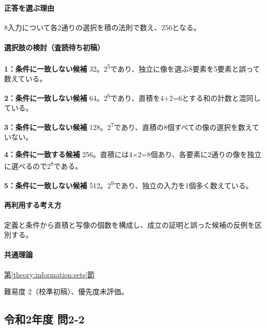\paragraph{正答を選ぶ理由} 8入力について各2通りの選択を積の法則で数え、256となる。

\paragraph{選択肢の検討（査読待ち初稿）}\mbox{}\par

\noindent\textbf{1：条件に一致しない候補} 32。2\textsuperscript{5}であり、独立に像を選ぶ8要素を5要素と誤って数えている。\par

\noindent\textbf{2：条件に一致しない候補} 64。2\textsuperscript{6}であり、直積を4+2=\allowbreak{}6とする和の計数と混同している。\par

\noindent\textbf{3：条件に一致しない候補} 128。2\textsuperscript{7}であり、直積の8個すべての像の選択を数えていない。\par

\noindent\textbf{4：条件に一致する候補} 256。直積には4×2=\allowbreak{}8個あり、各要素に2通りの像を独立に選べるので2\textsuperscript{8}である。\par

\noindent\textbf{5：条件に一致しない候補} 512。2\textsuperscript{9}であり、独立の入力を1個多く数えている。\par

\paragraph{再利用する考え方} 定義と条件から直積と写像の個数を構成し、成立の証明と誤った候補の反例を区別する。

\paragraph{共通理論} \hyperref[theory:information:sets]{第\ref*{theory:information:sets}節}

\par 難易度 2（校準初稿）、優先度未評価。

\subsection{令和2年度 問2-2}
\label{q:r02-reg-basic-2-2}

